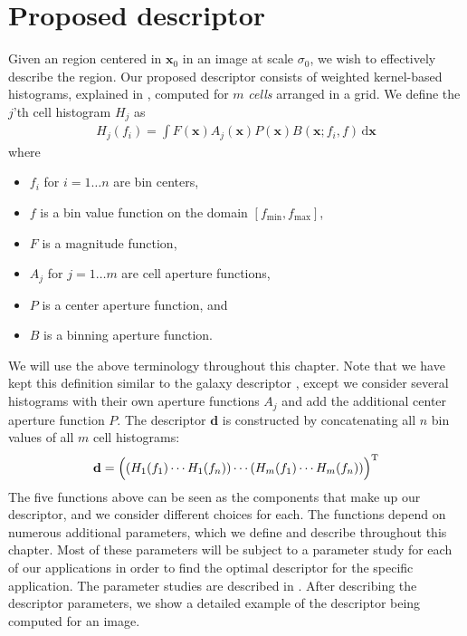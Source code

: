 \documentclass[thesis.tex]{subfiles}
\def\x{\mathbf{x}}
\def\d{\mathbf{d}}
\begin{document}
\chapter{Proposed descriptor}
%
Given an region centered in $\x_0$ in an image at scale $\sigma_0$, we wish to effectively describe the region. Our proposed descriptor consists of weighted kernel-based histograms, explained in , computed for $m$ \textit{cells} arranged in a grid. We define the $j$'th cell histogram $H_j$ as
%
\begin{align}
\label{eq:proposed_histogram}
H_j(f_i) = \int F(\x) A_j (\x) P (\x) B(\x; f_i,f) \,\text{d} \x
\end{align}
%
where
%
\begin{itemize}
\item[] $f_i$ for $i = 1 \dots n$ are bin centers,
\item[] $f$ is a bin value function on the domain $[f_\text{min},f_\text{max}]$,
\item[] $F$ is a magnitude function,
\item[] $A_j$ for $j = 1 \dots m$ are cell aperture functions,
\item[] $P$ is a center aperture function, and
\item[] $B$ is a binning aperture function.
\end{itemize}
%
We will use the above terminology throughout this chapter. Note that we have kept this definition similar to the galaxy descriptor \cite{pedersen2013shape}, except we consider several histograms with their own aperture functions $A_j$ and add the additional center aperture function $P$. The descriptor $\d$ is constructed by concatenating all $n$ bin values of all $m$ cell histograms:
%
\begin{align}
\label{eq:proposed_descriptor}
\d = \Bigl( \left(H_1(f_1) \cdots H_1(f_n)\right) \cdots (H_m(f_1) \cdots H_m(f_n)) \Bigr) ^\text{T}
\end{align}
%
The five functions above can be seen as the components that make up our descriptor, and we consider different choices for each. The functions depend on numerous additional parameters, which we define and describe throughout this chapter. Most of these parameters will be subject to a parameter study for each of our applications in order to find the optimal descriptor for the specific application. The parameter studies are described in . After describing the descriptor parameters, we show a detailed example of the descriptor being computed for an image.
%
\end{document}
